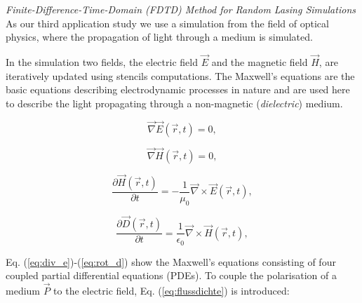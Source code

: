 \emph{Finite-Difference-Time-Domain (FDTD) Method for Random Lasing Simulations}
As our third application study we use a simulation from the field of optical physics, where the propagation of light through a medium is simulated.

In the simulation two fields, the electric field $\vec{E}$ and the magnetic field $\vec{H}$, are iteratively updated using stencils computations.
The Maxwell's equations are the basic equations describing electrodynamic processes in nature and are used here to describe the light propagating through a non-magnetic (\emph{dielectric}) medium.

\bigskip
\begin{minipage}{.44\linewidth}
\begin{equation} \vec{\nabla}\vec{E}\left(\vec{r}, t\right) = 0, \label{eq:div_e}\end{equation}
\end{minipage}
\hspace{.04\linewidth}
\begin{minipage}{.44\linewidth}
\begin{equation} \vec{\nabla}\vec{H}\left(\vec{r}, t\right) = 0, \label{eq:div_h}\end{equation}
\end{minipage}

\bigskip

\begin{minipage}{.44\linewidth}
\begin{equation} \frac{\partial\vec{H}\left(\vec{r}, t\right)}{\partial t} = -\frac{1}{\mu_0}\vec{\nabla} \times \vec{E}\left(\vec{r}, t\right), \label{eq:rot_h}\end{equation}
\end{minipage}
\hspace{.04\linewidth}
\begin{minipage}{.44\linewidth}
\begin{equation} \frac{\partial\vec{D}\left(\vec{r}, t\right)}{\partial t} = \frac{1}{\epsilon_0}\vec{\nabla} \times \vec{H}\left(\vec{r}, t\right), \label{eq:rot_d}\end{equation}
\end{minipage}
\bigskip

\newpage
\noindent
Eq. (\ref{eq:div_e})-(\ref{eq:rot_d}) show the Maxwell's equations consisting of four coupled partial differential equations (PDEs).
To couple the polarisation of a medium $\vec{P}$ to the electric field, Eq. (\ref{eq:flussdichte}) is introduced:


